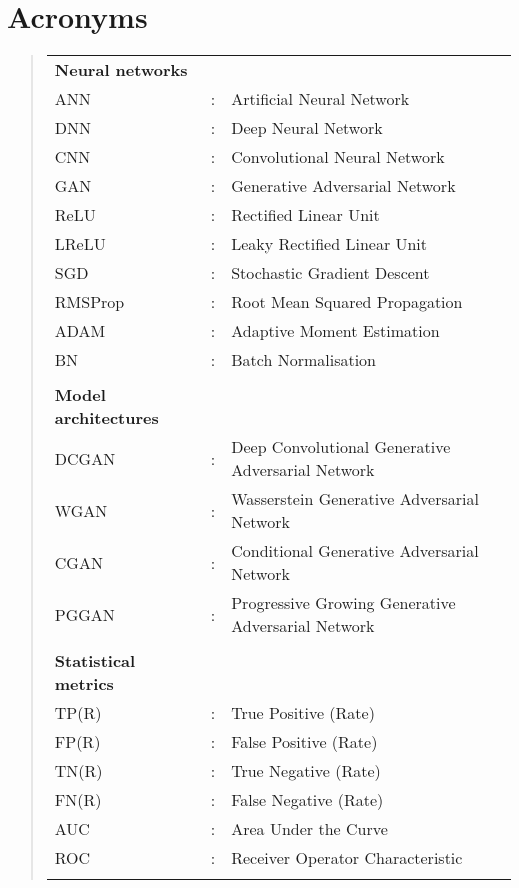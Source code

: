 \documentclass[
    author={Kai Hulme},
    supervisor={Dr Jon Bird},
    degree={BSc},
    title={Generative Adversarial Networks as an Augmentation Technique},
    subtitle={for Alzheimer's Disease Detection in MRI Volumes},
    type={Research},
    year={2021} 
]{dissertation}
\begin{document}

\chapter*{Acronyms}

\begin{quote}
\noindent
\begin{tabular}{lcl}

\textbf{Neural networks}\\
ANN & : & Artificial Neural Network \\
DNN & : & Deep Neural Network \\
CNN & : & Convolutional Neural Network \\
GAN & : & Generative Adversarial Network \\
ReLU & : & Rectified Linear Unit \\
LReLU & : & Leaky Rectified Linear Unit \\
SGD & : & Stochastic Gradient Descent \\
RMSProp & : & Root Mean Squared Propagation \\
ADAM & : & Adaptive Moment Estimation \\
BN & : & Batch Normalisation \\
\\

\textbf{Model architectures}\\
DCGAN & : & Deep Convolutional Generative Adversarial Network \\
WGAN & : & Wasserstein Generative Adversarial Network \\
CGAN & : & Conditional Generative Adversarial Network \\
PGGAN & : & Progressive Growing Generative Adversarial Network \\
\\

\textbf{Statistical metrics}\\
TP(R) & : & True Positive (Rate) \\
FP(R) & : & False Positive (Rate) \\
TN(R) & : & True Negative (Rate) \\
FN(R) & : & False Negative (Rate) \\
AUC & : & Area Under the Curve \\
ROC & : & Receiver Operator Characteristic \\
\\


\end{tabular}
\end{quote}
\end{document}
